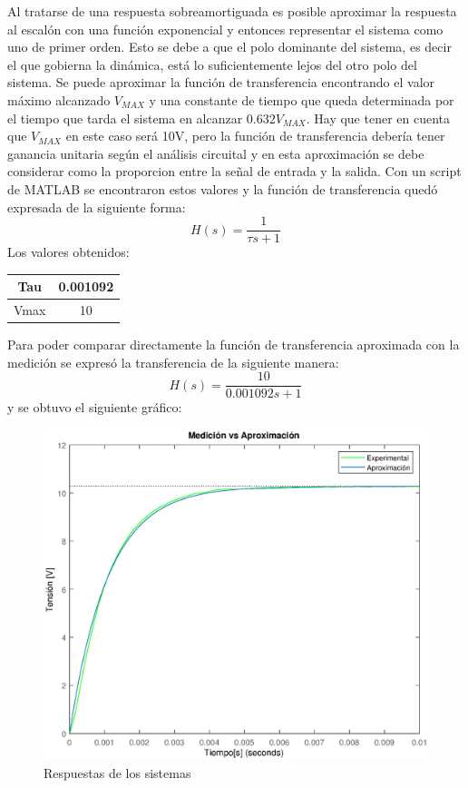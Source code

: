 \documentclass[10pt,a4paper]{article} %
\begin{document}
Al tratarse de una respuesta sobreamortiguada es posible aproximar la respuesta al escalón con una función exponencial y entonces representar el sistema como uno de primer orden. Esto se debe a que el polo dominante del sistema, es decir el que gobierna la dinámica, está lo suficientemente lejos del otro polo del sistema.
Se puede aproximar la función de transferencia encontrando el valor máximo alcanzado $V_{MAX}$ y una constante de tiempo que queda determinada por el tiempo que tarda el sistema en alcanzar $0.632V_{MAX}$. Hay que tener en cuenta que $V_{MAX}$ en este caso será 10V, pero la función de transferencia debería tener ganancia unitaria según el análisis circuital y en esta aproximación se debe considerar como la proporcion entre la señal de entrada y la salida.
Con un script de MATLAB se encontraron estos valores y la función de transferencia quedó expresada de la siguiente forma:
\begin{equation}
	H(s)=\frac{1}{\tau s + 1}
\end{equation}
Los valores obtenidos:
\begin{center}
	\begin{tabular}{|c|c|}
	\hline 
	Tau & 0.001092 \\ 
	\hline 
	Vmax & 10 \\ 
	\hline 
\end{tabular}
\end{center}
Para poder comparar directamente la función de transferencia aproximada con la medición se expresó la transferencia de la siguiente manera:
\begin{equation}
	H(s)=\frac{10}{0.001092 s + 1}
\end{equation}
 y se obtuvo el siguiente gráfico:
 \begin{figure}[H]
 	\begin{center}
 		\includegraphics[scale=0.5]{comp1}
 		\caption{Respuestas de los sistemas}
 	\end{center}
 \end{figure}
\end{document}
